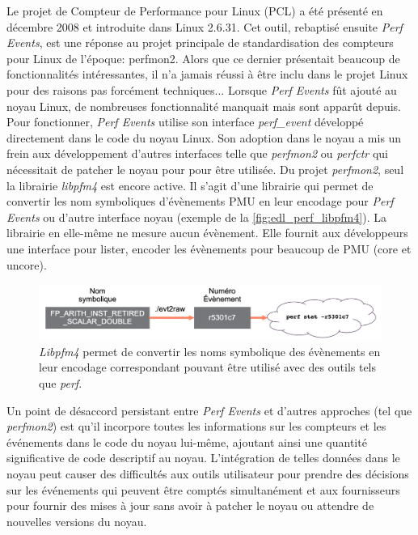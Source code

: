         Le projet de Compteur de Performance pour Linux (PCL) a été présenté en décembre 2008 et introduite dans Linux 2.6.31. Cet outil, rebaptisé ensuite \textit{Perf Events}, est une réponse au projet principale de standardisation des compteurs pour Linux de l'époque: perfmon2. Alors que ce dernier présentait beaucoup de fonctionnalités intéressantes, il n'a jamais réussi à être inclu dans le projet Linux pour des raisons pas forcément techniques... Lorsque \textit{Perf Events} fût ajouté au noyau Linux, de nombreuses fonctionnalité manquait mais sont apparût depuis. Pour fonctionner, \textit{Perf Events} utilise son interface \textit{perf\_event} développé directement dans le code du noyau Linux. Son adoption dans le noyau a mis un frein aux développement d'autres interfaces telle que \textit{perfmon2} ou \textit{perfctr} qui nécessitait de patcher le noyau pour pour être utilisée.  Du projet \textit{perfmon2}, seul la librairie \textit{libpfm4} est encore active. Il s'agit d'une librairie qui permet de convertir les nom symboliques d'évènements PMU en leur encodage pour \textit{Perf Events} ou d'autre interface noyau (exemple de la \autoref{fig:edl_perf_libpfm4}). La librairie en elle-même ne mesure aucun évènement. Elle fournit aux développeurs une interface pour lister, encoder les évènements pour beaucoup de PMU (core et uncore).
        
        \begin{figure}[h!]
        \center
        \includegraphics[width=12cm]{images/edl_perf_libpfm4.png}
        \caption{\label{fig:edl_perf_libpfm4} \textit{Libpfm4} permet de convertir les noms symbolique des évènements en leur encodage correspondant pouvant être utilisé avec des outils tels que \textit{perf}.}
        \end{figure}
        
        
        Un point de désaccord persistant entre \textit{Perf Events} et d'autres approches (tel que \textit{perfmon2}) est qu'il incorpore toutes les informations sur les compteurs et les événements dans le code du noyau lui-même, ajoutant ainsi une quantité significative de code descriptif au noyau. L'intégration de telles données dans le noyau peut causer des difficultés aux outils utilisateur pour prendre des décisions sur les événements qui peuvent être comptés simultanément et aux fournisseurs pour fournir des mises à jour sans avoir à patcher le noyau ou attendre de nouvelles versions du noyau.
        
